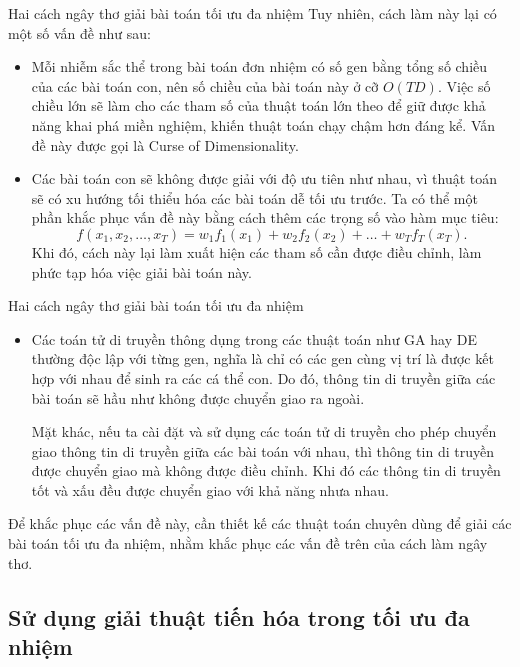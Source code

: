 \begin{frame}{Hai cách ngây thơ giải bài toán tối ưu đa nhiệm}
  Tuy nhiên, cách làm này lại có một số vấn đề như sau:
  \begin{itemize}
  \item Mỗi nhiễm sắc thể trong bài toán đơn nhiệm có số gen bằng tổng số chiều
    của các bài toán con, nên số chiều của bài toán này ở cỡ \( O(TD) \). Việc
    số chiều lớn sẽ làm cho các tham số của thuật toán lớn theo để giữ được khả
    năng khai phá miền nghiệm, khiến thuật toán chạy chậm hơn đáng kể.
    Vấn đề này được gọi là Curse of Dimensionality.
  \item Các bài toán con sẽ không được giải với độ ưu tiên như nhau, vì thuật
    toán sẽ có xu hướng tối thiểu hóa các bài toán dễ tối ưu trước. Ta có thể
    một phần khắc phục vấn đề này bằng cách thêm các trọng số vào hàm mục tiêu:
    \[
      f(x_{1}, x_{2}, \ldots ,x_{T}) = w_{1}f_{1}(x_{1}) + w_{2}f_{2}(x_{2}) +
      \ldots  + w_{T}f_{T}(x_{T})
    .\]
    Khi đó, cách này lại làm xuất hiện các tham số cần được điều chỉnh, làm
    phức tạp hóa việc giải bài toán này.
  \end{itemize}
\end{frame}

\begin{frame}{Hai cách ngây thơ giải bài toán tối ưu đa nhiệm}
  \begin{itemize}
  \item
    Các toán tử di truyền thông dụng trong các thuật toán như GA hay DE thường
    độc lập với từng gen, nghĩa là chỉ có các gen cùng vị trí là được kết hợp
    với nhau để sinh ra các cá thể con. Do đó, thông tin di truyền giữa các bài
    toán sẽ hầu như không được chuyển giao ra ngoài.

    Mặt khác, nếu ta cài đặt và sử dụng các toán tử di truyền cho phép chuyển
    giao thông tin di truyền giữa các bài toán với nhau, thì thông tin di truyền
    được chuyển giao mà không được điều chỉnh. Khi đó các thông tin di truyền
    tốt và xấu đều được chuyển giao với khả năng nhưa nhau.
  \end{itemize}

  Để khắc phục các vấn đề này, cần thiết kế các thuật toán chuyên dùng để giải
  các bài toán tối ưu đa nhiệm, nhằm khắc phục các vấn đề trên của cách làm ngây
  thơ.
\end{frame}


\subsection{Sử dụng giải thuật tiến hóa trong tối ưu đa nhiệm} %
\label{sub:Sử dụng giải thuật tiến hóa trong tối ưu đa nhiệm}

